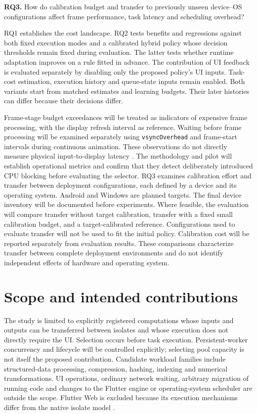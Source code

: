 \documentclass[14pt,a4paper,oneside]{extreport}
\begin{document}
\textbf{RQ3.} How do calibration budget and transfer to previously unseen device--OS
configurations affect frame performance, task latency and scheduling overhead?

RQ1 establishes the cost landscape. RQ2 tests benefits and regressions against both fixed
execution modes and a calibrated hybrid policy whose decision thresholds remain fixed during
evaluation. The latter tests whether runtime adaptation improves on a rule fitted in advance.
The contribution of UI feedback is evaluated separately by disabling only the proposed
policy's UI inputs. Task-cost estimation, execution history and queue-state inputs remain
enabled. Both variants start from matched estimates and learning budgets. Their later
histories can differ because their decisions differ.

Frame-stage budget exceedances will be treated as indicators of expensive frame processing,
with the display refresh interval as reference. Waiting before frame processing will be
examined separately using \texttt{vsyncOverhead} and frame-start intervals during continuous
animation. These observations do not directly measure physical input-to-display latency
\citep{flutter-frame, flutter-vsync, flutter-build}. The methodology and pilot will establish
operational metrics and confirm that they detect deliberately introduced CPU blocking before
evaluating the selector. RQ3 examines calibration effort and transfer between deployment
configurations, each defined by a device and its operating system. Android and Windows are
planned targets. The final device inventory will be documented before experiments. Where
feasible, the evaluation will compare transfer without target calibration, transfer with a
fixed small calibration budget, and a target-calibrated reference. Configurations used to
evaluate transfer will not be used to fit the initial policy. Calibration cost will be
reported separately from evaluation results. These comparisons characterize transfer between
complete deployment environments and do not identify independent effects of hardware and
operating system.

\section{Scope and intended contributions}
\label{scope-and-intended-contributions}

The study is limited to explicitly registered computations whose inputs and outputs can be
transferred between isolates and whose execution does not directly require the UI. Selection
occurs before task execution. Persistent-worker concurrency and lifecycle will be controlled
explicitly; selecting pool capacity is not itself the proposed contribution. Candidate
workload families include structured-data processing, compression, hashing, indexing and
numerical transformations. UI operations, ordinary network waiting, arbitrary migration of
running code and changes to the Flutter engine or operating-system scheduler are outside the
scope. Flutter Web is excluded because its execution mechanisms differ from the native isolate
model \citep{flutter-isolates}.
\end{document}
